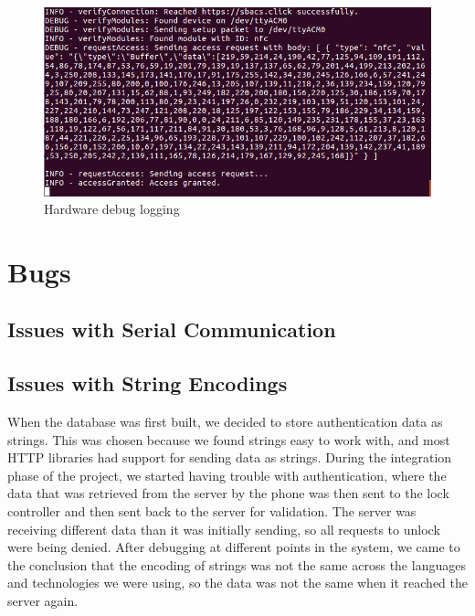 \documentclass[12pt]{report}
\let\Oldsection\section
\renewcommand{\section}{\FloatBarrier\Oldsection}
\let\Oldsubsection\subsection
\renewcommand{\subsection}{\FloatBarrier\Oldsubsection}
\begin{document}
\begin{figure}
    \includegraphics[width=\textwidth]{Diagrams/Hardware-Diagrams/access_granted}
    \caption{Hardware debug logging}
    \label{fig:hardware-debug-logging}
\end{figure}

\section{Bugs} \label{bugs}

\subsection{Issues with Serial Communication} \label{issues-with-serial-communcation}


\subsection{Issues with String Encodings} \label{issues-with-string-encodings}

When the database was first built, we decided to store authentication data as strings. This
was chosen because we found strings easy to work with, and most HTTP libraries had support
for sending data as strings. During the integration phase of the project, we started having trouble
with authentication, where the data that was retrieved from the server by the phone was then sent
to the lock controller and then sent back to the server for validation. The server was receiving
different data than it was initially sending, so all requests to unlock were being denied. After
debugging at different points in the system, we came to the conclusion that the encoding of
strings was not the same across the languages and technologies we were using, so the data was
not the same when it reached the server again.
\end{document}
